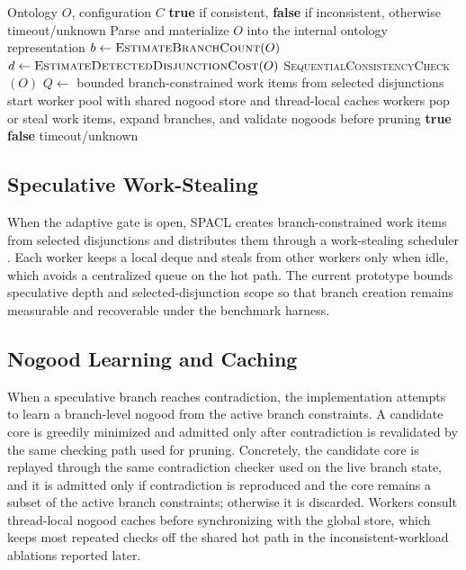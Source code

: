 \documentclass[preprint,12pt,times]{elsarticle}
\begin{document}
\begin{algorithm}[htbp]
\caption{SPACL Consistency Check}
\label{alg:spacl}
\begin{algorithmic}[1]
\Require Ontology $O$, configuration $C$
\Ensure \textbf{true} if consistent, \textbf{false} if inconsistent, otherwise timeout/unknown
\State Parse and materialize $O$ into the internal ontology representation
\State $b \gets \textsc{EstimateBranchCount}(O)$
\State $d \gets \textsc{EstimateDetectedDisjunctionCost}(O)$
    \State \Return \textsc{SequentialConsistencyCheck}$(O)$
\EndIf
\State $Q \gets$ bounded branch-constrained work items from selected disjunctions
\State start worker pool with shared nogood store and thread-local caches
    \State workers pop or steal work items, expand branches, and validate nogoods before pruning
        \State \Return \textbf{true}
        \State \Return \textbf{false}
    \EndIf
\EndWhile
\State \Return timeout/unknown
\end{algorithmic}
\end{algorithm}

\subsection{Speculative Work-Stealing}
\label{sec:workstealing}

When the adaptive gate is open, SPACL creates branch-constrained work items from selected disjunctions and distributes them through a work-stealing scheduler \cite{workstealing}. Each worker keeps a local deque and steals from other workers only when idle, which avoids a centralized queue on the hot path. The current prototype bounds speculative depth and selected-disjunction scope so that branch creation remains measurable and recoverable under the benchmark harness.

\subsection{Nogood Learning and Caching}
\label{sec:nogood}

When a speculative branch reaches contradiction, the implementation attempts to learn a branch-level nogood from the active branch constraints. A candidate core is greedily minimized and admitted only after contradiction is revalidated by the same checking path used for pruning. Concretely, the candidate core is replayed through the same contradiction checker used on the live branch state, and it is admitted only if contradiction is reproduced and the core remains a subset of the active branch constraints; otherwise it is discarded. Workers consult thread-local nogood caches before synchronizing with the global store, which keeps most repeated checks off the shared hot path in the inconsistent-workload ablations reported later.
\end{document}
